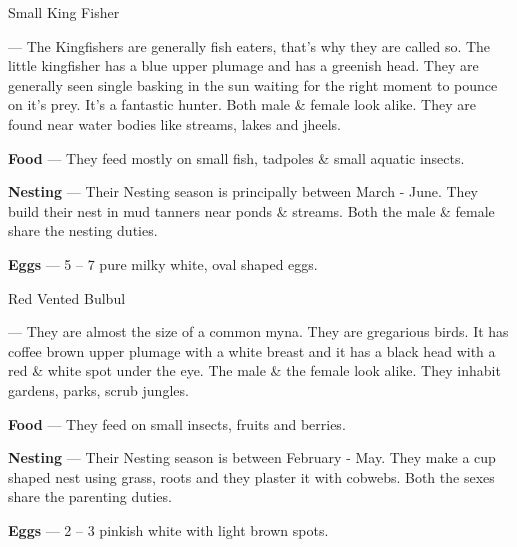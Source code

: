 \begin{bird}{Small King Fisher}

 --- The Kingfishers are generally fish eaters, that's why they are called so. The little kingfisher has a blue upper plumage and has a greenish head. They are generally seen single basking in the sun waiting for the right moment to pounce on it's prey. It's a fantastic hunter. Both male \& female look alike. They are found near water bodies like streams, lakes and jheels.

{\large\bf Food} --- They feed mostly on small fish, tadpoles \& small aquatic insects.

{\large\bf Nesting} --- Their Nesting season is principally between March - June. They build their nest in mud tanners near ponds \& streams. Both the male \& female share the nesting duties.

{\large\bf Eggs} --- 5 -- 7 pure milky white, oval shaped eggs.
\end{bird}

\begin{bird}{Red Vented Bulbul}

 --- They are almost the size of a common myna. They are gregarious birds. It has coffee brown upper plumage with a white breast and it has a black head with a red \& white spot under the eye. The male \& the female look alike. They inhabit gardens, parks, scrub jungles.

{\large\bf Food} --- They feed on small insects, fruits and berries.

{\large\bf Nesting} --- Their Nesting season is between February - May. They make a cup shaped nest using grass, roots and they plaster it with cobwebs. Both the sexes share the parenting duties.

{\large\bf Eggs} --- 2 -- 3 pinkish white with light brown spots.
\end{bird}

